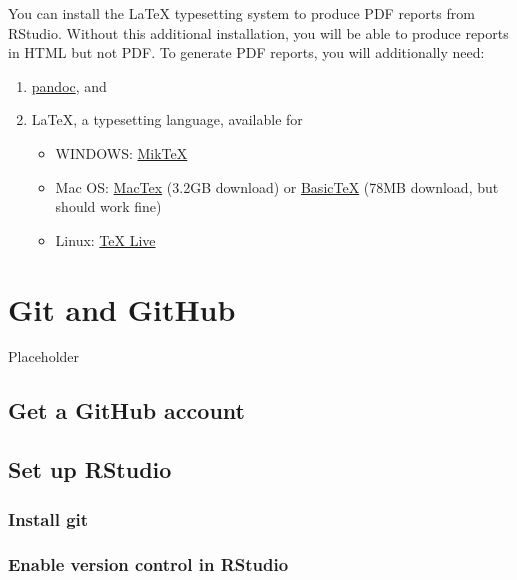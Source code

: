 \documentclass[
]{book}
\providecommand{\tightlist}{%
  \setlength{\itemsep}{0pt}\setlength{\parskip}{0pt}}
\begin{document}
You can install the LaTeX typesetting system to produce PDF reports from RStudio. Without this additional installation, you will be able to produce reports in HTML but not PDF. To generate PDF reports, you will additionally need:

\begin{enumerate}
\def\labelenumi{\arabic{enumi}.}
\tightlist
\item
  \href{http://pandoc.org/installing.html}{pandoc}, and
\item
  LaTeX, a typesetting language, available for

  \begin{itemize}
  \tightlist
  \item
    WINDOWS: \href{http://miktex.org/}{MikTeX}
  \item
    Mac OS: \href{https://tug.org/mactex/downloading.html}{MacTex} (3.2GB download) or \href{http://ww.tug.org/mactex/morepackages.html}{BasicTeX} (78MB download, but should work fine)
  \item
    Linux: \href{https://www.tug.org/texlive/}{TeX Live}
  \end{itemize}
\end{enumerate}

\hypertarget{setup-git}{%
\chapter{Git and GitHub}\label{setup-git}}

Placeholder

\hypertarget{get-a-github-account}{%
\section{Get a GitHub account}\label{get-a-github-account}}

\hypertarget{set-up-rstudio}{%
\section{Set up RStudio}\label{set-up-rstudio}}

\hypertarget{install-git}{%
\subsection{Install git}\label{install-git}}

\hypertarget{enable-version-control-in-rstudio}{%
\subsection{Enable version control in RStudio}\label{enable-version-control-in-rstudio}}
\end{document}
